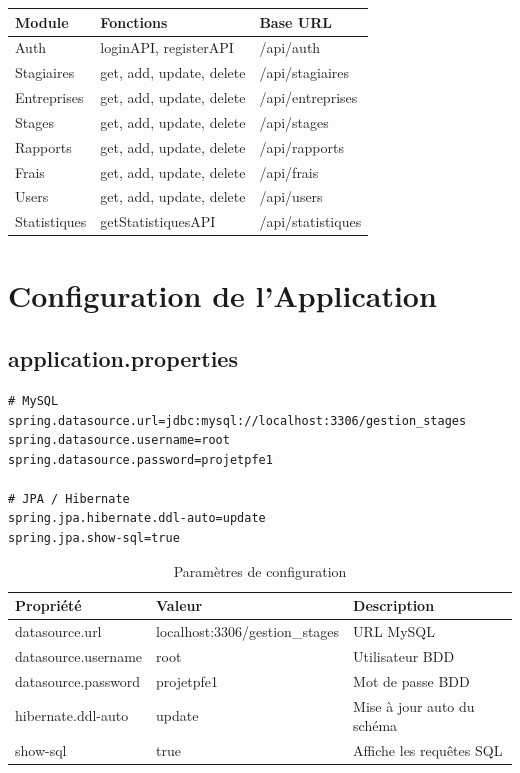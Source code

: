 \documentclass[12pt,a4paper]{report}
\begin{document}
\begin{longtable}{|l|l|l|}
\hline
\textbf{Module} & \textbf{Fonctions} & \textbf{Base URL} \\ \hline \endhead
Auth & loginAPI, registerAPI & /api/auth \\ \hline
Stagiaires & get, add, update, delete & /api/stagiaires \\ \hline
Entreprises & get, add, update, delete & /api/entreprises \\ \hline
Stages & get, add, update, delete & /api/stages \\ \hline
Rapports & get, add, update, delete & /api/rapports \\ \hline
Frais & get, add, update, delete & /api/frais \\ \hline
Users & get, add, update, delete & /api/users \\ \hline
Statistiques & getStatistiquesAPI & /api/statistiques \\ \hline
\end{longtable}

\chapter{Configuration de l'Application}

\section{application.properties}

\begin{lstlisting}[caption=Configuration Spring Boot]
# MySQL
spring.datasource.url=jdbc:mysql://localhost:3306/gestion_stages
spring.datasource.username=root
spring.datasource.password=projetpfe1

# JPA / Hibernate
spring.jpa.hibernate.ddl-auto=update
spring.jpa.show-sql=true
\end{lstlisting}

\begin{table}[H]
\centering
\begin{tabular}{|l|l|p{5.5cm}|}
\hline
\textbf{Propriété} & \textbf{Valeur} & \textbf{Description} \\ \hline
datasource.url & localhost:3306/gestion\_stages & URL MySQL \\ \hline
datasource.username & root & Utilisateur BDD \\ \hline
datasource.password & projetpfe1 & Mot de passe BDD \\ \hline
hibernate.ddl-auto & update & Mise à jour auto du schéma \\ \hline
show-sql & true & Affiche les requêtes SQL \\ \hline
\end{tabular}
\caption{Paramètres de configuration}
\end{table}
\end{document}
